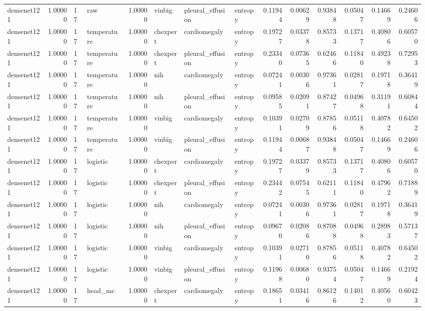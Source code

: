 \begin{tabular}{lrllrlllrrrrrr}
densenet121 & 1.00000 & 17 & raw & 1.00000 & vinbig & pleural\_effusion & entropy & 0.11944 & 0.00629 & 0.93848 & 0.05047 & 0.14669 & 0.24606 \\
densenet121 & 1.00000 & 17 & temperature & 1.00000 & chexpert & cardiomegaly & entropy & 0.19727 & 0.03378 & 0.85733 & 0.13717 & 0.40806 & 0.60570 \\
densenet121 & 1.00000 & 17 & temperature & 1.00000 & chexpert & pleural\_effusion & entropy & 0.23340 & 0.07365 & 0.62466 & 0.11840 & 0.49238 & 0.72953 \\
densenet121 & 1.00000 & 17 & temperature & 1.00000 & nih & cardiomegaly & entropy & 0.07241 & 0.00306 & 0.97361 & 0.02817 & 0.19718 & 0.36419 \\
densenet121 & 1.00000 & 17 & temperature & 1.00000 & nih & pleural\_effusion & entropy & 0.09585 & 0.02091 & 0.87427 & 0.04968 & 0.31191 & 0.60844 \\
densenet121 & 1.00000 & 17 & temperature & 1.00000 & vinbig & cardiomegaly & entropy & 0.10391 & 0.02709 & 0.87856 & 0.05118 & 0.40782 & 0.64502 \\
densenet121 & 1.00000 & 17 & temperature & 1.00000 & vinbig & pleural\_effusion & entropy & 0.11944 & 0.00687 & 0.93848 & 0.05047 & 0.14669 & 0.24606 \\
densenet121 & 1.00000 & 17 & logistic & 1.00000 & chexpert & cardiomegaly & entropy & 0.19727 & 0.03379 & 0.85733 & 0.13717 & 0.40806 & 0.60570 \\
densenet121 & 1.00000 & 17 & logistic & 1.00000 & chexpert & pleural\_effusion & entropy & 0.23442 & 0.07545 & 0.62111 & 0.11840 & 0.47962 & 0.71889 \\
densenet121 & 1.00000 & 17 & logistic & 1.00000 & nih & cardiomegaly & entropy & 0.07241 & 0.00306 & 0.97361 & 0.02817 & 0.19718 & 0.36419 \\
densenet121 & 1.00000 & 17 & logistic & 1.00000 & nih & pleural\_effusion & entropy & 0.09670 & 0.02086 & 0.87088 & 0.04968 & 0.28983 & 0.57137 \\
densenet121 & 1.00000 & 17 & logistic & 1.00000 & vinbig & cardiomegaly & entropy & 0.10391 & 0.02710 & 0.87856 & 0.05118 & 0.40782 & 0.64502 \\
densenet121 & 1.00000 & 17 & logistic & 1.00000 & vinbig & pleural\_effusion & entropy & 0.11968 & 0.00680 & 0.93754 & 0.05047 & 0.14669 & 0.21924 \\
densenet121 & 1.00000 & 17 & head\_mc & 1.00000 & chexpert & cardiomegaly & entropy & 0.18651 & 0.03416 & 0.86126 & 0.14012 & 0.40560 & 0.60423 \\

\end{tabular}
